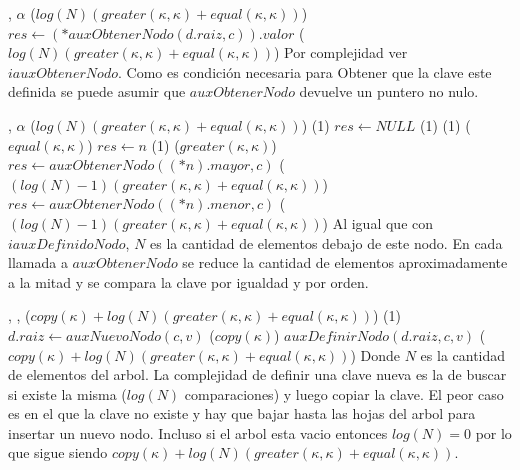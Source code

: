 {   ,
    }
{$\alpha$}
{\bigo($log(N)(greater(\kappa, \kappa)+equal(\kappa, \kappa))$)}
{   \State $res \gets (*auxObtenerNodo(d.raiz, c)).valor$               \comment \bigo($log(N)(greater(\kappa, \kappa)+equal(\kappa, \kappa))$)
}
{   Por complejidad ver $iauxObtenerNodo$. Como es condición necesaria para Obtener 
    que la clave este definida se puede asumir que $auxObtenerNodo$ devuelve un puntero no nulo. }

{   ,
    }
{$\alpha$}
{\bigo($log(N)(greater(\kappa, \kappa)+equal(\kappa, \kappa))$)}
{                                                        \comment \bigo(1)
        \State $res \gets NULL$                                         \comment \bigo(1)
    \Else                                                               \comment \bigo(1)
                                                   \comment \bigo($equal(\kappa, \kappa)$)
            \State $res \gets n$                                        \comment \bigo(1)
        \Else
                                                   \comment \bigo($greater(\kappa, \kappa)$)
                \State $res \gets auxObtenerNodo((*n).mayor, c)$        \comment \bigo($(log(N)-1)(greater(\kappa, \kappa)+equal(\kappa, \kappa))$)
            \Else
                \State $res \gets auxObtenerNodo((*n).menor, c)$        \comment \bigo($(log(N)-1)(greater(\kappa, \kappa)+equal(\kappa, \kappa))$)
            \EndIf
        \EndIf
    \EndIf
}
{   Al igual que con $iauxDefinidoNodo$, $N$ es la cantidad de elementos debajo de este nodo.
    En cada llamada a $auxObtenerNodo$ se reduce la cantidad de elementos aproximadamente a la mitad y se
    compara la clave por igualdad y por orden. }


{   ,
    ,
    }
{}
{\bigo($copy(\kappa)+log(N)(greater(\kappa, \kappa)+equal(\kappa, \kappa))$)}
{                                                   \comment \bigo(1)
        \State $d.raiz \gets auxNuevoNodo(c, v)$                        \comment \bigo($copy(\kappa)$)
    \Else
        \State $auxDefinirNodo(d.raiz, c, v)$                           \comment \bigo($copy(\kappa)+log(N)(greater(\kappa, \kappa)+equal(\kappa, \kappa))$) 
    \EndIf
}
{   Donde $N$ es la cantidad de elementos del arbol. La complejidad de
    definir una clave nueva es la de buscar si existe la misma ($log(N)$ comparaciones)
    y luego copiar la clave. El peor caso es en el que la clave no existe y hay que 
    bajar hasta las hojas del arbol para insertar un nuevo nodo.
    Incluso si el arbol esta vacio entonces $log(N) = 0$ por lo que sigue siendo
    $copy(\kappa)+log(N)(greater(\kappa, \kappa)+equal(\kappa, \kappa))$. }



